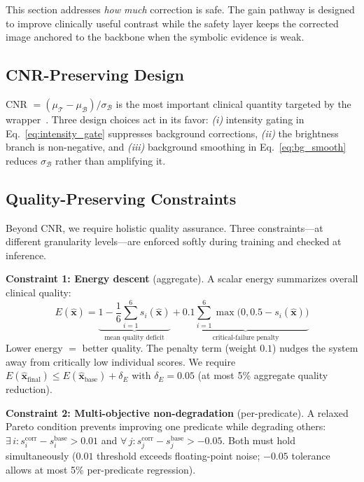 \documentclass{ieeetj}
\begin{document}
This section addresses \emph{how much} correction is safe. The gain pathway is designed to improve clinically useful contrast while the safety layer keeps the corrected image anchored to the backbone when the symbolic evidence is weak.

\subsection{CNR-Preserving Design}
\label{sec:cnr_design}
CNR $=(\mu_\mathcal{T}-\mu_\mathcal{B})/\sigma_\mathcal{B}$ is the most important clinical quantity targeted by the wrapper~\cite{rodriguez2020generalized}. Three design choices act in its favor: \emph{(i)} intensity gating in Eq.~\eqref{eq:intensity_gate} suppresses background corrections, \emph{(ii)} the brightness branch is non-negative, and \emph{(iii)} background smoothing in Eq.~\eqref{eq:bg_smooth} reduces $\sigma_\mathcal{B}$ rather than amplifying it.

\subsection{Quality-Preserving Constraints}
\label{sec:formal}
Beyond CNR, we require holistic quality assurance. Three constraints---at different granularity levels---are enforced softly during training and checked at inference.

\textbf{Constraint 1: Energy descent} (aggregate). A scalar energy summarizes overall clinical quality:
\begin{equation}
E(\hat{\mathbf{x}}) = \underbrace{1 - \frac{1}{6}\sum_{i=1}^{6} s_i(\hat{\mathbf{x}})}_{\text{mean quality deficit}} + \underbrace{0.1 \sum_{i=1}^{6} \max\big(0, 0.5 - s_i(\hat{\mathbf{x}})\big)}_{\text{critical-failure penalty}}
\label{eq:energy}
\end{equation}
Lower energy $=$ better quality. The penalty term (weight $0.1$) nudges the system away from critically low individual scores. We require $E(\hat{\mathbf{x}}_\text{final}) \leq E(\hat{\mathbf{x}}_\text{base}) + \delta_E$ with $\delta_E = 0.05$ (at most 5\% aggregate quality reduction).

\textbf{Constraint 2: Multi-objective non-degradation} (per-predicate). A relaxed Pareto condition prevents improving one predicate while degrading others: $\exists\, i: s_i^\text{corr} - s_i^\text{base} > 0.01$ and $\forall\, j: s_j^\text{corr} - s_j^\text{base} > -0.05$. Both must hold simultaneously ($0.01$ threshold exceeds floating-point noise; $-0.05$ tolerance allows at most 5\% per-predicate regression).
\end{document}
